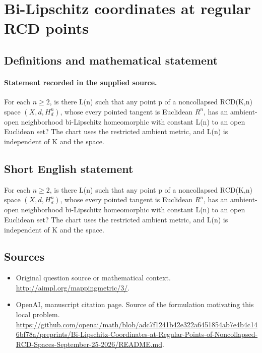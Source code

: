 \documentclass[11pt]{article}
\begin{document}
\section*{Bi-Lipschitz coordinates at regular RCD points}\label{statement}
\subsection{Definitions and mathematical statement}
\paragraph{Statement recorded in the supplied source.}
For each $n\geq 2$, is there L(n) such that any point p of a noncollapsed RCD(K,n) space $(X,d,H^{n}_d)$, whose every pointed tangent is Euclidean $R^{n}$, has an ambient-open neighborhood bi-Lipschitz homeomorphic with constant L(n) to an open Euclidean set? The chart uses the restricted ambient metric, and L(n) is independent of K and the space.
\subsection{Short English statement}
For each $n\geq 2$, is there L(n) such that any point p of a noncollapsed RCD(K,n) space $(X,d,H^{n}_d)$, whose every pointed tangent is Euclidean $R^{n}$, has an ambient-open neighborhood bi-Lipschitz homeomorphic with constant L(n) to an open Euclidean set? The chart uses the restricted ambient metric, and L(n) is independent of K and the space.
\subsection{Sources}
\begin{itemize}
\item[S1] Original question source or mathematical context.
\url{http://aimpl.org/mappingmetric/3/}.
\item[S2] OpenAI, manuscript citation page. Source of the formulation motivating this local problem.
\url{https://github.com/openai/math/blob/adc7f1241b42e322a6451854ab7e4b4c146bf78a/preprints/Bi-Lipschitz-Coordinates-at-Regular-Points-of-Noncollapsed-RCD-Spaces-September-25-2026/README.md}.
\end{itemize}
\end{document}
